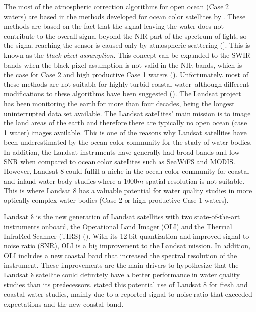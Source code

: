 \documentclass[onecolumn,3p]{elsarticle}
\begin{document}
The most of the atmospheric correction algorithms for open ocean (Case 2 waters) are based in the methods developed for ocean color satellites by \cite{Gordon:1997}. These methods are based on the fact that the signal leaving the water does not contribute to the overall signal beyond the NIR part of the spectrum of light, so the signal reaching the sensor is caused only by atmospheric scattering (\cite{Gordon:1994}). This is known as the {\it black pixel assumption}. This concept can be expanded to the SWIR bands when the black pixel assumption is not valid in the NIR bands, which is the case for Case 2 and high productive Case 1 waters (\cite{Wang:2007}). Unfortunately, most of these methods are not suitable for highly turbid coastal water, although different modifications to these algorithms have been suggested (\cite{Patt2003}).
The Landsat project has been monitoring the earth for more than four decades, being the longest uninterrupted data set available. The Landsat satellites' main mission is to image the land areas of the earth and therefore there are typically no open ocean (case 1 water) images available. This is one of the reasons why Landsat satellites have been underestimated by the ocean color community for the study of water bodies. In addition, the Landsat instruments have generally had broad bands and low SNR when compared to ocean color satellites such as SeaWiFS and MODIS. However, Landsat 8 could fulfill a niche in the ocean color community for coastal and inland water body studies where a $1000m$ spatial resolution is not suitable. This is where Landsat 8 has a valuable potential for water quality studies in more optically complex water bodies (Case 2 or high productive Case 1 waters). 

Landsat 8 is the new generation of Landsat satellites with two state-of-the-art instruments onboard, the Operational Land Imager (OLI) and the Thermal InfraRed Scanner (TIRS) (\cite{Irons:2012}). With its 12-bit quantization and improved signal-to-noise ratio (SNR), OLI is a big improvement to the Landsat mission. In addition, OLI includes a new coastal band that increased the spectral resolution of the instrument. These improvements are the main drivers to hypothesize that the Landsat 8 satellite could definitely have a better performance in water quality studies than its predecessors. \cite{Roy:2014} stated this potential use of Landsat 8 for fresh and coastal water studies, mainly due to a reported signal-to-noise ratio that exceeded expectations and the new coastal band. 
\end{document}
